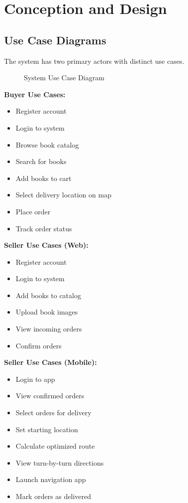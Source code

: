 \documentclass[12pt,a4paper]{article}
\begin{document}
\newpage

\section{Conception and Design}

\subsection{Use Case Diagrams}

The system has two primary actors with distinct use cases.

\begin{figure}[h]
    \centering
    \caption{System Use Case Diagram}
\end{figure}

\textbf{Buyer Use Cases:}
\begin{itemize}
    \item Register account
    \item Login to system
    \item Browse book catalog
    \item Search for books
    \item Add books to cart
    \item Select delivery location on map
    \item Place order
    \item Track order status
\end{itemize}

\textbf{Seller Use Cases (Web):}
\begin{itemize}
    \item Register account
    \item Login to system
    \item Add books to catalog
    \item Upload book images
    \item View incoming orders
    \item Confirm orders
\end{itemize}

\textbf{Seller Use Cases (Mobile):}
\begin{itemize}
    \item Login to app
    \item View confirmed orders
    \item Select orders for delivery
    \item Set starting location
    \item Calculate optimized route
    \item View turn-by-turn directions
    \item Launch navigation app
    \item Mark orders as delivered
\end{itemize}
\end{document}

